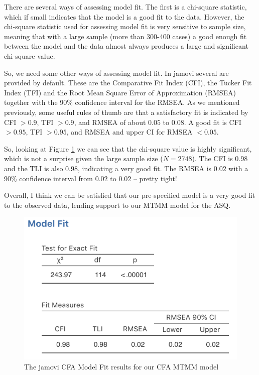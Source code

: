 \documentclass[
]{book}
\begin{document}
There are several ways of assessing model fit. The first is a chi-square statistic, which if small indicates that the model is a good fit to the data. However, the chi-square statistic used for assessing model fit is very sensitive to sample size, meaning that with a large sample (more than 300-400 cases) a good enough fit between the model and the data almost always produces a large and significant chi-square value.

So, we need some other ways of assessing model fit. In jamovi several are provided by default. These are the Comparative Fit Index (CFI), the Tucker Fit Index (TFI) and the Root Mean Square Error of Approximation (RMSEA) together with the 90\% confidence interval for the RMSEA. As we mentioned previously, some useful rules of thumb are that a satisfactory fit is indicated by CFI \(>0.9\), TFI \(>0.9\), and RMSEA of about \(0.05\) to \(0.08\). A good fit is CFI \(>0.95\), TFI \(>0.95\), and RMSEA and upper CI for RMSEA \(<0.05\).

So, looking at Figure \ref{fig:MTMM6} we can see that the chi-square value is highly significant, which is not a surprise given the large sample size (\(N=2748\)). The CFI is \(0.98\) and the TLI is also \(0.98\), indicating a very good fit. The RMSEA is \(0.02\) with a 90\% confidence interval from \(0.02\) to \(0.02\) -- pretty tight!

Overall, I think we can be satisfied that our pre-specified model is a very good fit to the observed data, lending support to our MTMM model for the ASQ.

\begin{figure}

{\centering \includegraphics[width=1\linewidth]{img/factoranalysis/MTMM6} 

}

\caption{The jamovi CFA Model Fit results for our CFA MTMM model}\label{fig:MTMM6}
\end{figure}
\end{document}
